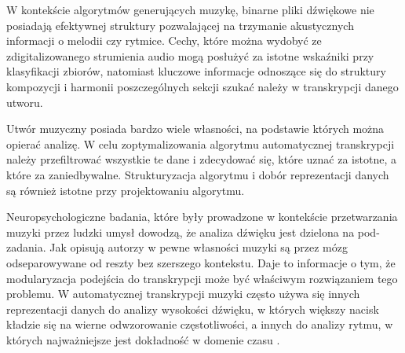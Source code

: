 \documentclass[12pt,a4paper,twoside]{mwart}
\begin{document}
W kontekście algorytmów generujących muzykę, binarne pliki dźwiękowe nie posiadają efektywnej struktury pozwalającej na trzymanie akustycznych informacji o melodii czy rytmice. Cechy, które można wydobyć ze zdigitalizowanego strumienia audio mogą posłużyć za istotne wskaźniki przy klasyfikacji zbiorów, natomiast kluczowe informacje odnoszące się do struktury kompozycji i harmonii poszczególnych sekcji szukać należy w transkrypcji danego utworu. 

Utwór muzyczny posiada bardzo wiele własności, na podstawie których można opierać analizę. W celu zoptymalizowania algorytmu automatycznej transkrypcji należy przefiltrować wszystkie te dane i zdecydować się, które uznać za istotne, a które za zaniedbywalne. Strukturyzacja algorytmu i dobór reprezentacji danych są również istotne przy projektowaniu algorytmu.

Neuropsychologiczne badania, które były prowadzone w kontekście przetwarzania muzyki przez ludzki umysł dowodzą, że analiza dźwięku jest dzielona na pod-zadania. Jak opisują autorzy w \cite{Transcription:Zatorre:AuditoryCortex} pewne własności muzyki są przez mózg odseparowywane od reszty bez szerszego kontekstu. Daje to informacje o tym, że modularyzacja podejścia do transkrypcji może być właściwym rozwiązaniem tego problemu. W automatycznej transkrypcji muzyki często używa się innych reprezentacji danych do analizy wysokości dźwięku, w których większy nacisk kładzie się na wierne odwzorowanie częstotliwości, a innych do analizy rytmu, w których najważniejsze jest dokładność w domenie czasu 
\cite[11-13]{Transcription:Anssi:SignalProcessingMethods}.
\end{document}
